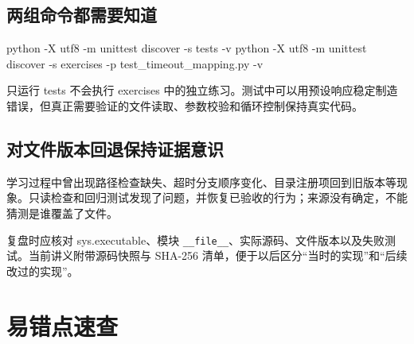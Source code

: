 \documentclass[UTF8,zihao=-4,fontset=fandol]{ctexart}
\begin{document}
\subsection{两组命令都需要知道}

\begin{Code}
python -X utf8 -m unittest discover -s tests -v
python -X utf8 -m unittest discover -s exercises -p test_timeout_mapping.py -v
\end{Code}

只运行 tests 不会执行 exercises 中的独立练习。测试中可以用预设响应稳定制造错误，但真正需要验证的文件读取、参数校验和循环控制保持真实代码。

\subsection{对文件版本回退保持证据意识}

学习过程中曾出现路径检查缺失、超时分支顺序变化、目录注册项回到旧版本等现象。只读检查和回归测试发现了问题，并恢复已验收的行为；来源没有确定，不能猜测是谁覆盖了文件。

复盘时应核对 sys.executable、模块 \nolinkurl{__file__}、实际源码、文件版本以及失败测试。当前讲义附带源码快照与 SHA-256 清单，便于以后区分“当时的实现”和“后续改过的实现”。

\section{易错点速查}
\end{document}
